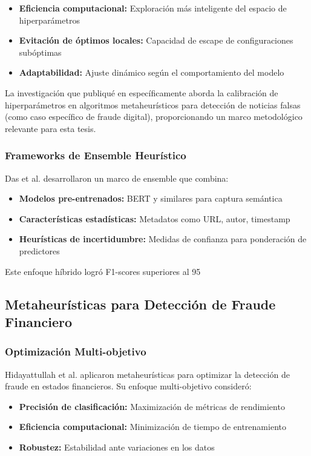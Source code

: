 \begin{itemize}
    \item \textbf{Eficiencia computacional:} Exploración más inteligente del espacio de hiperparámetros
    \item \textbf{Evitación de óptimos locales:} Capacidad de escape de configuraciones subóptimas
    \item \textbf{Adaptabilidad:} Ajuste dinámico según el comportamiento del modelo
\end{itemize}

La investigación que publiqué en \cite{hurtado2024calibracion} específicamente aborda la calibración de hiperparámetros en algoritmos metaheurísticos para detección de noticias falsas (como caso específico de fraude digital), proporcionando un marco metodológico relevante para esta tesis.

\subsubsection{Frameworks de Ensemble Heurístico}

Das et al. \cite{das2022heuristic} desarrollaron un marco de ensemble que combina:
\begin{itemize}
    \item \textbf{Modelos pre-entrenados:} BERT y similares para captura semántica
    \item \textbf{Características estadísticas:} Metadatos como URL, autor, timestamp
    \item \textbf{Heurísticas de incertidumbre:} Medidas de confianza para ponderación de predictores
\end{itemize}

Este enfoque híbrido logró F1-scores superiores al 95%

\subsection{Metaheurísticas para Detección de Fraude Financiero}

\subsubsection{Optimización Multi-objetivo}

Hidayattullah et al. \cite{hidayattullah2020financial} aplicaron metaheurísticas para optimizar la detección de fraude en estados financieros. Su enfoque multi-objetivo consideró:
\begin{itemize}
    \item \textbf{Precisión de clasificación:} Maximización de métricas de rendimiento
    \item \textbf{Eficiencia computacional:} Minimización de tiempo de entrenamiento
    \item \textbf{Robustez:} Estabilidad ante variaciones en los datos
\end{itemize}

